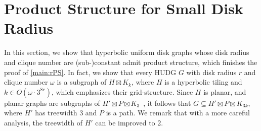 \section{Product Structure for Small Disk Radius}
\label{sec:upper_bound}
%
\newcommand{\upperBound}{3^{8r}}
%
%
%
In this section, we show that hyperbolic uniform disk graphs whose disk radius and clique number are (sub-)constant admit product structure, which finishes the proof of \cref{main:rPS}.
In fact, we show that every HUDG $ G $ with disk radius $ r $ and clique number $ \omega $ is a subgraph of $ H \boxtimes K_k $, where $ H $ is a hyperbolic tiling and $ k \in O(\omega \cdot \upperBound) $, which emphasizes their grid-structure.
Since $ H $ is planar, and planar graphs are subgraphs of $ H' \boxtimes P \boxtimes K_3 $~\cite{dujmovic_planar_2019}, it follows that $ G \subseteq H' \boxtimes P \boxtimes K_{3k} $, where $ H' $ has treewidth $ 3 $ and $ P $ is a path.
We remark that with a more careful analysis, the treewidth of $ H' $ can be improved to 2.
%
